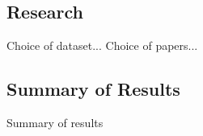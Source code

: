 \subsection{Research}

Choice of dataset...
\newline
Choice of papers...



\subsection{Summary of Results}
Summary of results